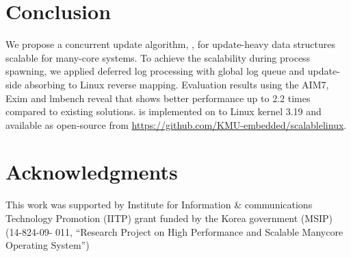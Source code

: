 \section{Conclusion}
We propose a concurrent update algorithm, , for update-heavy data structures 
scalable for many-core systems.
To achieve the scalability during process spawning, 
we applied deferred log processing with global log queue and 
update-side absorbing to Linux reverse mapping.
Evaluation results using the AIM7, Exim and lmbench reveal that  shows
better performance up to 2.2 times compared to existing solutions.
 is implemented on to Linux kernel 3.19 and available as open-source from
\url{https://github.com/KMU-embedded/scalablelinux}.

\section{Acknowledgments}
This work was supported by Institute for Information \& communications Technology 
Promotion (IITP) grant funded by the Korea government (MSIP) (14-824-09-
011, “Research Project on High Performance and Scalable Manycore Operating System”)
